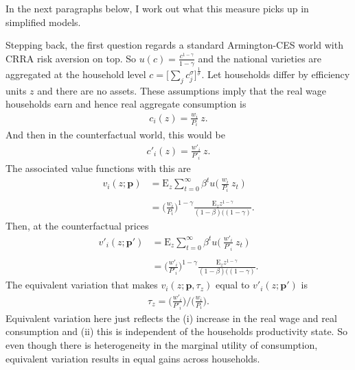 \documentclass[12pt,pdftex]{article}
\begin{document}
\begin{onehalfspacing}
In the next paragraphs below, I work out what this measure picks up in simplified models.

Stepping back, the first question regards a standard Armington-CES world with CRRA risk aversion on top. So $u(c) = \frac{c^{1-\gamma}}{1-\gamma}$ and the national varieties are aggregated at the household level $c = \big [ \sum_{j} c_{j}^{\sigma} \big ]^{\frac{1}{\sigma}}$.  Let households differ by efficiency units $z$ and there are no assets. These assumptions imply that the real wage households earn and hence real aggregate consumption is
\begin{align}
c_i(z) = \frac{w_{i}}{P_{i}} \ z.
\end{align}
And then in the counterfactual world, this would be
\begin{align}
c'_i(z) = \frac{w'_{i}}{P'_{i}} \ z.
\end{align}
The associated value functions with this are
\begin{align}
v_i(z ; \mathbf{p}) & = \mathrm{E}_{z} \sum_{t = 0}^{\infty} \beta^{t} u \bigg ( \ \frac{w_{i}}{P_{i}} \ z_{t} \ \bigg ) \\
\nonumber \\
& =\bigg( \frac{w_{i}}{P_{i}}  \bigg )^{1-\gamma} \frac{\mathrm{E}_{z} z^{1-\gamma}}{(1 - \beta)((1-\gamma)}.
\end{align}
Then, at the counterfactual prices
\begin{align}
v'_i(z ; \mathbf{p'}) & = \mathrm{E}_{z} \sum_{t = 0}^{\infty} \beta^{t} u \bigg ( \ \frac{w'_{i}}{P'_{i}} \ z_{t} \ \bigg ) \\
\nonumber \\
& =\bigg( \frac{w'_{i}}{P'_{i}}  \bigg )^{1-\gamma} \frac{\mathrm{E}_{z} z^{1-\gamma}}{(1 - \beta)((1-\gamma)}.
\end{align}
The equivalent variation that makes $v_i(z ; \mathbf{p}, \tau_z)$ equal to $v'_i(z ; \mathbf{p'})$ is
\begin{align}
\tau_z  = \bigg( \frac{w'_{i}}{P'_{i}} \bigg ) \bigg / \bigg( \frac{w_{i}}{P_{i}} \bigg).
\end{align}
Equivalent variation here just reflects the (i) increase in the real wage and real consumption and (ii) this is independent of the households productivity state. So even though there is heterogeneity in the marginal utility of consumption, equivalent variation results in equal gains across households.


\end{onehalfspacing}
\end{document}
